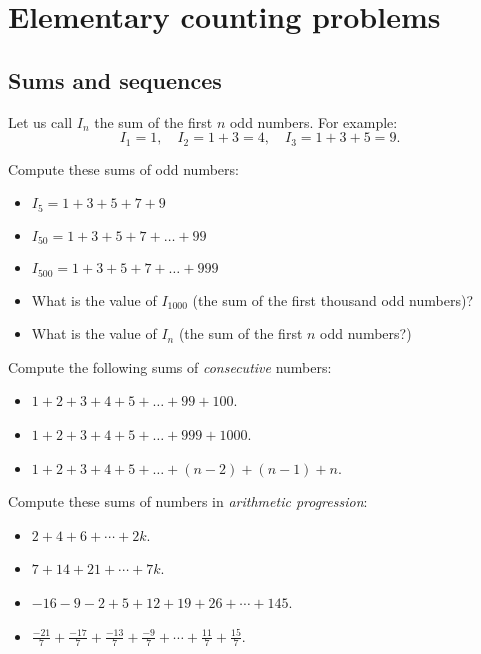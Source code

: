 \chapter{Elementary counting problems}

\section{Sums and sequences}

Let us call $I_n$ the sum of the first $n$ odd numbers. For example:
$$I_1=1, \quad I_2=1+3=4, \quad I_3=1+3+5=9.$$%
\begin{exercise}\label{Prob:SumImp}
Compute these sums of odd numbers:
  \begin{itemize}  
  \item $I_5=1+3+5+7+9$
  \item $I_{50}=1+3+5+7+\dots+99$
  \item $I_{500}=1+3+5+7+\dots+999$
  \item What is the value of $I_{1000}$ (the sum of the first thousand odd numbers)?
  \item What is the value of $I_n$ (the sum of the first $n$ odd numbers?)
\end{itemize}
\end{exercise}
\tutpagebreak

\begin{exercise}\label{Prob:SumGau}
Compute the following sums of \emph{consecutive} numbers:
\begin{itemize} 
    \item $1+2+3+4+5+\dots+99+100$.
    \item $1+2+3+4+5+\dots+999+1000$.
    \item $1+2+3+4+5+\dots+(n-2)+(n-1)+n$.    
\end{itemize}
\end{exercise}

\begin{exercise}
Compute these sums of numbers in \emph{arithmetic progression}:
\begin{itemize} 
    \item $2+4+6+\cdots +2k$.
    \item $7+14+21+\cdots +7k$.
    \item $-16-9-2+5+12+19+26+\cdots +145$.
    \item $\frac{-21}{7} + \frac{-17}{7} + \frac{-13}{7}+ \frac{-9}{7} + \cdots + \frac{11}{7} + \frac{15}{7}$.  
\end{itemize}
\end{exercise}
\tutpagebreak

